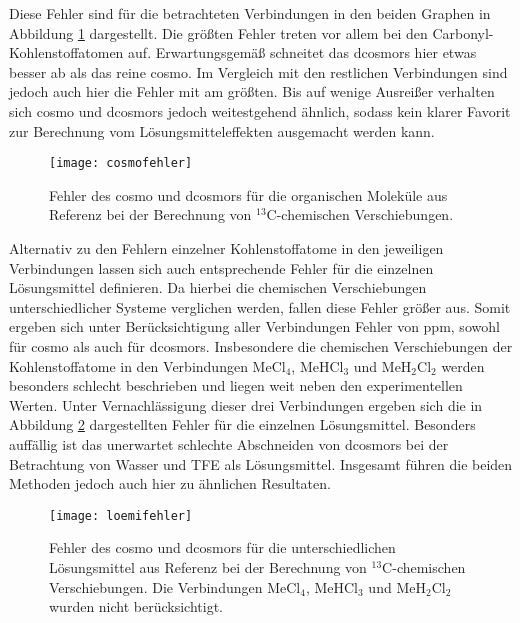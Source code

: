     Diese Fehler sind für die betrachteten Verbindungen in den beiden Graphen in Abbildung \ref{abb:cosmofehler} dargestellt. Die größten Fehler treten vor allem bei den Carbonyl-Kohlenstoffatomen auf. Erwartungsgemäß schneitet das \ac{dcosmors} hier etwas besser ab als das reine \ac{cosmo}. Im Vergleich mit den restlichen Verbindungen sind jedoch auch hier die Fehler mit am größten. Bis auf wenige Ausreißer verhalten sich \ac{cosmo} und \ac{dcosmors} jedoch weitestgehend ähnlich, sodass kein klarer Favorit zur Berechnung vom Lösungsmitteleffekten ausgemacht werden kann.
   	\begin{figure}[ht!]
	\centering
	\texttt{[image: cosmofehler]}
	\captionsetup{figurewithin = chapter}
	\captionsetup{font=small, labelfont=bf}\caption[{Fehler des \ac{cosmo} und \ac{dcosmors} für $^{13}$C-chemische Verschiebungen}]{Fehler des \ac{cosmo} und \ac{dcosmors} für die organischen Moleküle aus Referenz \cite{fulmer2010nmr} bei der Berechnung von $^{13}$C-chemischen Verschiebungen.}
	\label{abb:cosmofehler}
	\end{figure} 
\vfill
\FloatBarrier
\newpage
	Alternativ zu den Fehlern einzelner Kohlenstoffatome in den jeweiligen Verbindungen lassen sich auch entsprechende Fehler für die einzelnen Lösungsmittel definieren. Da hierbei die chemischen Verschiebungen unterschiedlicher Systeme verglichen werden, fallen diese Fehler größer aus. Somit ergeben sich unter Berücksichtigung aller Verbindungen Fehler von \unit[10--11]{ppm}, sowohl für \ac{cosmo} als auch für \ac{dcosmors}. Insbesondere die chemischen Verschiebungen der Kohlenstoffatome in den Verbindungen MeCl$_4$, MeHCl$_3$ und MeH$_2$Cl$_2$ werden besonders schlecht beschrieben und liegen weit neben den experimentellen Werten. Unter Vernachlässigung dieser drei Verbindungen ergeben sich die in Abbildung \ref{abb:loemifehler} dargestellten Fehler für die einzelnen Lösungsmittel. Besonders auffällig ist das unerwartet schlechte Abschneiden von \ac{dcosmors} bei der Betrachtung von Wasser und TFE als Lösungsmittel. Insgesamt führen die beiden Methoden jedoch auch hier zu ähnlichen Resultaten.
   	\begin{figure}[ht!]
	\centering
	\texttt{[image: loemifehler]}
	\captionsetup{figurewithin = chapter}
	\captionsetup{font=small, labelfont=bf}\caption[{Fehler des \ac{cosmo} und \ac{dcosmors} für unterschiedliche Lösungsmittel}]{Fehler des \ac{cosmo} und \ac{dcosmors} für die unterschiedlichen Lösungsmittel aus Referenz \cite{fulmer2010nmr} bei der Berechnung von $^{13}$C-chemischen Verschiebungen. Die Verbindungen MeCl$_4$, MeHCl$_3$ und MeH$_2$Cl$_2$ wurden nicht berücksichtigt.}
	\label{abb:loemifehler}
	\end{figure}    	
\vfil
\newpage
	

